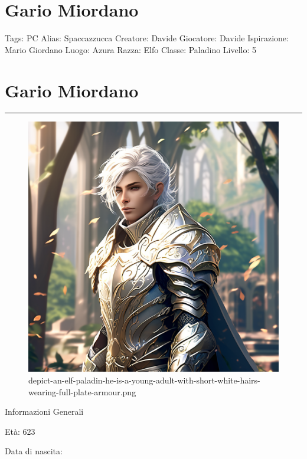 \section{Gario Miordano}\label{gario-miordano}

Tags: PC Alias: Spaccazzucca Creatore: Davide Giocatore: Davide
Ispirazione: Mario Giordano Luogo: Azura Razza: Elfo Classe: Paladino
Livello: 5

\section{Gario Miordano}\label{gario-miordano-1}

\begin{center}\rule{0.5\linewidth}{0.5pt}\end{center}

\begin{figure}
\centering
\includegraphics{depict-an-elf-paladin-he-is-a-young-adult-with-short-white-hairs-wearing-full-plate-armour.png}
\caption{depict-an-elf-paladin-he-is-a-young-adult-with-short-white-hairs-wearing-full-plate-armour.png}
\end{figure}

Informazioni Generali

Età: 623

Data di nascita:

